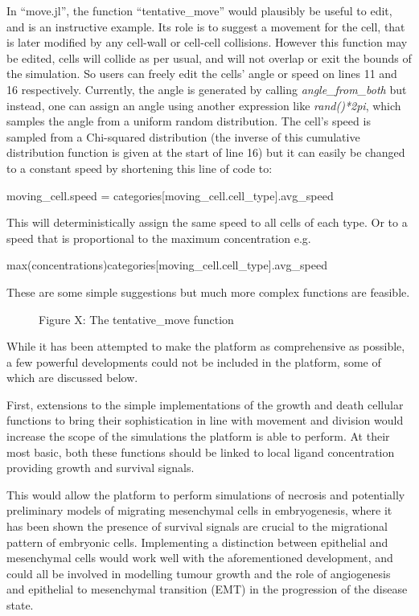 \documentclass[12pt]{article}
\begin{document}
In ``move.jl'', the function ``tentative\_move'' would plausibly be 
useful to edit, and is an instructive example. Its role is to suggest a 
movement for the cell, that is later modified by any cell-wall or 
cell-cell collisions. However this function may be edited, cells will 
collide as per usual, and will not overlap or exit the bounds of the 
simulation. So users can freely edit the cells' angle or speed on lines 
11 and 16 respectively. Currently, the angle is generated by calling 
{\itshape angle\_from\_both} but instead, one can assign an angle using 
another expression like {\itshape rand()*2pi}, which samples the angle 
from a uniform random distribution. The cell's speed is sampled from a 
Chi-squared distribution (the inverse of this cumulative distribution 
function is given at the start of line 16) but it can easily be changed 
to a constant speed by shortening this line of code to:

{\fontsize{10pt}{10pt} \ttfamily
moving\_cell.speed = categories{[}moving\_cell.cell\_type{]}.avg\_speed} 

This will deterministically assign the same speed to all cells of 
each type. Or to a speed that is proportional to the maximum 
concentration e.g. 

{\fontsize{10pt}{10pt}\ttfamily 
max(concentrations)categories{[}moving\_cell.cell\_type{]}.avg\_speed} 

These are some simple suggestions but much more complex functions are 
feasible.

\begin{figure}[H]
\centering
\caption{Figure X: The tentative\_move function}
\end{figure}

While it has been attempted to make the platform as comprehensive as 
possible, a few powerful developments could not be included in the 
platform, some of which are discussed below. 

First, extensions to the simple implementations of the growth and death 
cellular functions to bring their sophistication in line with movement 
and division would increase the scope of the simulations the platform is 
able to perform. At their most basic, both these functions should be 
linked to local ligand concentration providing growth and survival 
signals. 

This would allow the platform to perform simulations of necrosis and 
potentially preliminary models of migrating mesenchymal cells in 
embryogenesis, where it has been shown the presence of survival signals 
are crucial to the migrational pattern of embryonic cells.\cite{raz09} Implementing 
a distinction between epithelial and mesenchymal cells would work well 
with the aforementioned development, and could all be involved in 
modelling tumour growth and the role of angiogenesis and epithelial to 
mesenchymal transition (EMT) in the progression of the disease state.
\end{document}
